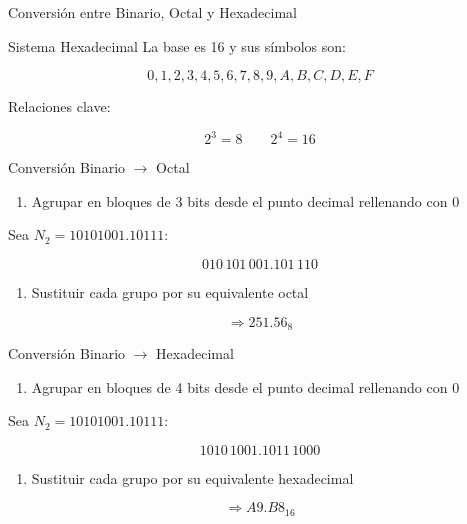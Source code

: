 \documentclass[presentation]{beamer}
\begin{document}
\begin{frame}[label={sec:org7e038f4}]{Conversión entre Binario, Octal y Hexadecimal}
\begin{block}{Sistema Hexadecimal}
La base es 16 y sus símbolos son:

$$0,1,2,3,4,5,6,7,8,9,A,B,C,D,E,F$$

Relaciones clave:

$$2^3 = 8 \qquad 2^4 = 16$$
\end{block}

\begin{block}{Conversión Binario \(\rightarrow\) Octal}
\begin{enumerate}
\item Agrupar en bloques de \alert{3 bits} desde el punto decimal rellenando con 0
\end{enumerate}

Sea \(N_2 = 10101001.10111\):

$$010\,101\,001.101\,110$$

\begin{enumerate}
\item Sustituir cada grupo por su equivalente octal
\end{enumerate}

$$\Rightarrow 251.56_8$$
\end{block}

\begin{block}{Conversión Binario \(\rightarrow\) Hexadecimal}
\begin{enumerate}
\item Agrupar en bloques de \alert{4 bits} desde el punto decimal rellenando con 0
\end{enumerate}

Sea \(N_2 = 10101001.10111\):

$$1010\,1001.1011\,1000$$

\begin{enumerate}
\item Sustituir cada grupo por su equivalente hexadecimal
\end{enumerate}

$$\Rightarrow A9.B8_{16}$$
\end{block}
\end{frame}
\end{document}
